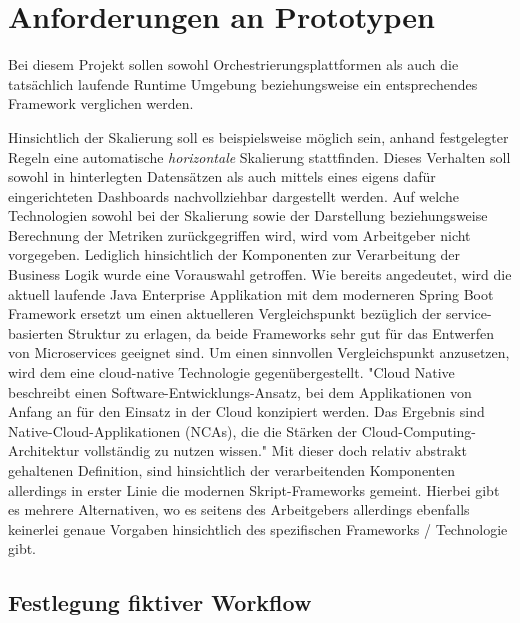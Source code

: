\section{Anforderungen an Prototypen}

Bei diesem Projekt sollen sowohl Orchestrierungsplattformen als auch die tatsächlich laufende Runtime Umgebung beziehungsweise ein entsprechendes Framework verglichen werden. 

Hinsichtlich der Skalierung soll es beispielsweise möglich sein, anhand festgelegter Regeln eine automatische \emph{horizontale} Skalierung stattfinden. Dieses Verhalten soll sowohl in hinterlegten Datensätzen als auch mittels eines eigens dafür eingerichteten Dashboards nachvollziehbar dargestellt werden. Auf welche Technologien sowohl bei der Skalierung sowie der Darstellung beziehungsweise Berechnung der Metriken zurückgegriffen wird, wird vom Arbeitgeber nicht vorgegeben. Lediglich hinsichtlich der Komponenten zur Verarbeitung der Business Logik wurde eine Vorauswahl getroffen. Wie bereits angedeutet, wird die aktuell laufende Java Enterprise Applikation mit dem moderneren Spring Boot Framework ersetzt um einen aktuelleren Vergleichspunkt bezüglich der service-basierten Struktur zu erlagen, da beide Frameworks sehr gut für das Entwerfen von Microservices geeignet sind. Um einen sinnvollen Vergleichspunkt anzusetzen, wird dem eine cloud-native Technologie gegenübergestellt. "Cloud Native beschreibt einen Software-Entwicklungs-Ansatz, bei dem Applikationen von Anfang an für den Einsatz in der Cloud konzipiert werden. Das Ergebnis sind Native-Cloud-Applikationen (NCAs), die die Stärken der Cloud-Computing-Architektur vollständig zu nutzen wissen." \cite{cn-def} Mit dieser doch relativ abstrakt gehaltenen Definition, sind hinsichtlich der verarbeitenden Komponenten allerdings in erster Linie die modernen Skript-Frameworks gemeint. Hierbei gibt es mehrere Alternativen, wo es seitens des Arbeitgebers allerdings ebenfalls keinerlei genaue Vorgaben hinsichtlich des spezifischen Frameworks / Technologie gibt.

\subsection{Festlegung fiktiver Workflow}
\label{ss:fiktiverWorkflow}

